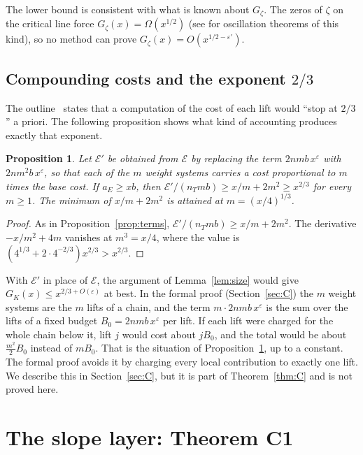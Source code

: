 \documentclass[11pt]{amsart}
\newcommand{\eps}{\varepsilon}
\theoremstyle{plain}
\newtheorem{proposition}[theorem]{Proposition}
\theoremstyle{definition}
\numberwithin{equation}{section}
\begin{document}
The lower bound is consistent with what is known about $G_\zeta$. The zeros of $\zeta$ on the
critical line force $G_\zeta(x)=\Omega(x^{1/2})$ (see \cite[Chapter~15]{montgomery-vaughan} for
oscillation theorems of this kind), so no method can prove $G_\zeta(x)=O(x^{1/2-\eps'})$.

\subsection{Compounding costs and the exponent \texorpdfstring{$2/3$}{2/3}}

The outline~\cite{alpoge-remark} states that a computation of the cost of each lift would ``stop at
$2/3$'' a priori. The following proposition shows what kind of accounting produces exactly that
exponent.

\begin{proposition}\label{prop:twothirds}
Let $\mathcal E'$ be obtained from $\mathcal E$ by replacing the term $2nmb\,x^{\eps}$ with
$2nm^2b\,x^{\eps}$, so that each of the $m$ weight systems carries a cost proportional to $m$ times
the base cost. If $a_E\ge xb$, then $\mathcal E'/(n_Tmb)\ge x/m+2m^2\ge x^{2/3}$ for every
$m\ge1$. The minimum of $x/m+2m^2$ is attained at $m=(x/4)^{1/3}$.
\end{proposition}

\begin{proof}
As in Proposition~\ref{prop:terms}, $\mathcal E'/(n_Tmb)\ge x/m+2m^2$. The derivative
$-x/m^2+4m$ vanishes at $m^3=x/4$, where the value is $(4^{1/3}+2\cdot4^{-2/3})x^{2/3}>x^{2/3}$.
\end{proof}

With $\mathcal E'$ in place of $\mathcal E$, the argument of Lemma~\ref{lem:size} would give
$G_K(x)\le x^{2/3+O(\eps)}$ at best. In the formal proof (Section~\ref{sec:C}) the $m$ weight systems
are the $m$ lifts of a chain, and the term $m\cdot2nmb\,x^{\eps}$ is the sum over the lifts of a
fixed budget $B_0=2nmb\,x^{\eps}$ per lift. If each lift were charged for the whole chain below it,
lift $j$ would cost about $jB_0$, and the total would be about $\frac{m^2}{2}B_0$ instead of $mB_0$.
That is the situation of Proposition~\ref{prop:twothirds}, up to a constant. The formal proof avoids
it by charging every local contribution to exactly one lift. We describe this in
Section~\ref{sec:C}, but it is part of Theorem~\ref{thm:C} and is not proved here.
\section{The slope layer: Theorem C1}\label{sec:slope}
\end{document}
